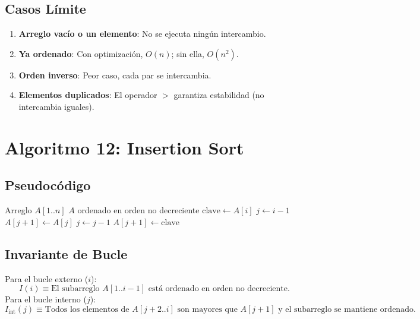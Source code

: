 \documentclass[11pt,a4paper]{article}
\newcommand{\inv}{I}
\begin{document}
\subsection{Casos Límite}
\begin{enumerate}
    \item \textbf{Arreglo vacío o un elemento}: No se ejecuta ningún intercambio.
    \item \textbf{Ya ordenado}: Con optimización, $O(n)$; sin ella, $O(n^2)$.
    \item \textbf{Orden inverso}: Peor caso, cada par se intercambia.
    \item \textbf{Elementos duplicados}: El operador $>$ garantiza estabilidad (no intercambia iguales).
\end{enumerate}

\newpage

\section{Algoritmo 12: Insertion Sort}

\subsection{Pseudocódigo}
\begin{algorithm}[H]
\caption{Insertion Sort}
\begin{algorithmic}[1]
\Require Arreglo $A[1..n]$
\Ensure $A$ ordenado en orden no decreciente
    \State $\text{clave} \gets A[i]$
    \State $j \gets i - 1$
        \State $A[j+1] \gets A[j]$
        \State $j \gets j - 1$
    \EndWhile
    \State $A[j+1] \gets \text{clave}$
\EndFor
\end{algorithmic}
\end{algorithm}

\subsection{Invariante de Bucle}
Para el bucle externo ($i$):
\[
\boxed{\inv(i) \equiv \text{El subarreglo } A[1..i-1] \text{ está ordenado en orden no decreciente.}}
\]
Para el bucle interno ($j$):
\[
\inv_{\text{int}}(j) \equiv \text{Todos los elementos de } A[j+2..i] \text{ son mayores que } A[j+1] \text{ y el subarreglo se mantiene ordenado.}
\]
\end{document}
